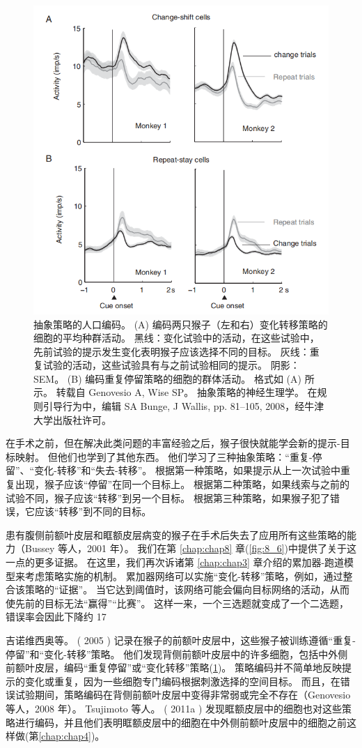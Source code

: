  \begin{figure}
	\centering
	\includegraphics[width=0.6\linewidth]{image_pfc/Fig_7_11}
	\caption{抽象策略的人口编码。
		 (A) 编码两只猴子（左和右）变化转移策略的细胞的平均种群活动。 
		 黑线：变化试验中的活动，在这些试验中，先前试验的提示发生变化表明猴子应该选择不同的目标。 
		 灰线：重复试验的活动，这些试验具有与之前试验相同的提示。 
		 阴影：SEM。 (B) 编码重复停留策略的细胞的群体活动。 
		 格式如 (A) 所示。 转载自 Genovesio A, Wise SP。 
		 抽象策略的神经生理学。 
		 在规则引导行为中，编辑 SA Bunge, J Wallis, pp. 81–105, 2008，经牛津大学出版社许可。\label{fig:7_11}}
\end{figure}
\par 

在手术之前，但在解决此类问题的丰富经验之后，猴子很快就能学会新的提示-目标映射。 
但他们也学到了其他东西。 他们学习了三种抽象策略：“重复-停留”、“变化-转移”和“失去-转移”。 
根据第一种策略，如果提示从上一次试验中重复出现，猴子应该“停留”在同一个目标上。 
根据第二种策略，如果线索与之前的试验不同，猴子应该“转移”到另一个目标。 
根据第三种策略，如果猴子犯了错误，它应该“转移”到不同的目标。	
\par


患有腹侧前额叶皮层和眶额皮层病变的猴子在手术后失去了应用所有这些策略的能力（Bussey 等人，2001 年）。 
我们在第 \ref{chap:chap8} 章(\ref{fig:8_6})中提供了关于这一点的更多证据。
在这里，我们再次诉诸第 \ref{chap:chap3} 章介绍的累加器-跑道模型来考虑策略实施的机制。 
累加器网络可以实施“变化-转移”策略，例如，通过整合该策略的“证据”。
当它达到阈值时，该网络可能会偏向目标网络的活动，从而使先前的目标无法“赢得”“比赛”。 
这样一来，一个三选题就变成了一个二选题，错误率会因此下降约 17%
\par


吉诺维西奥等。 ( 2005 ) 记录在猴子的前额叶皮层中，这些猴子被训练遵循“重复-停留”和“变化-转移”策略。 
他们发现背侧前额叶皮层中的许多细胞，包括中外侧前额叶皮层，编码“重复停留”或“变化转移”策略(\ref{fig:7_11})。 
策略编码并不简单地反映提示的变化或重复，因为一些细胞专门编码根据刺激选择的空间目标。 
而且，在错误试验期间，策略编码在背侧前额叶皮层中变得非常弱或完全不存在（Genovesio 等人，2008 年）。 
Tsujimoto 等人。 ( 2011a ) 发现眶额皮层中的细胞也对这些策略进行编码，并且他们表明眶额皮层中的细胞在中外侧前额叶皮层中的细胞之前这样做(第\ref{chap:chap4})。
\par 


